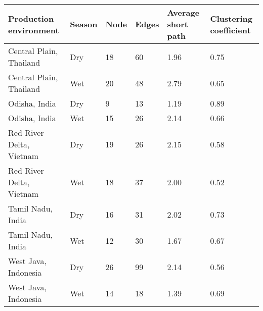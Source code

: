 \begin{table}
\centering
\label{table:network_prop}
\begin{tabular}{llllll}
\hline
Production environment   & Season & Node & Edges & Average short path & Clustering coefficient \\
\hline
Central Plain, Thailand  & Dry    & 18   & 60    & 1.96               & 0.75                   \\
Central Plain, Thailand  & Wet    & 20   & 48    & 2.79               & 0.65                   \\
Odisha, India            & Dry    & 9    & 13    & 1.19               & 0.89                   \\
Odisha, India            & Wet    & 15   & 26    & 2.14               & 0.66                   \\
Red River Delta, Vietnam & Dry    & 19   & 26    & 2.15               & 0.58                   \\
Red River Delta, Vietnam & Wet    & 18   & 37    & 2.00               & 0.52                   \\
Tamil Nadu, India        & Dry    & 16   & 31    & 2.02               & 0.73                   \\
Tamil Nadu, India        & Wet    & 12   & 30    & 1.67               & 0.67                   \\
West Java, Indonesia     & Dry    & 26   & 99    & 2.14               & 0.56                   \\
West Java, Indonesia     & Wet    & 14   & 18    & 1.39               & 0.69                   \\
\hline
\end{tabular}
\end{table}
